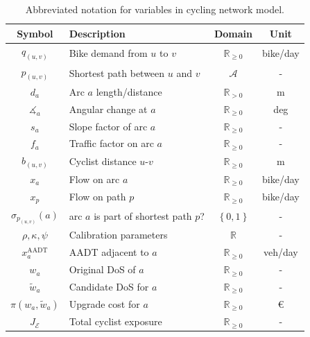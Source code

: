 \documentclass[letterpaper, 10 pt, conference]{ieeeconf}  %
\begin{document}
\begin{table}[h!]
\centering
\vspace{0.2cm}
\begin{tabular}{|c|l|c|c|}
\hline
\textbf{Symbol} & \textbf{Description} & \textbf{Domain} & \textbf{Unit} \\ \hline
$q_{(u,v)}$ & Bike demand from $u$ to $v$ & $\mathbb{R}_{\geq 0}$ & bike/day \\
$p_{(u,v)}$ & Shortest path between $u$ and $v$ & $\mathcal{A}$ & - \\ 
$d_{a}$ & Arc $a$ length/distance & $\mathbb{R}_{>0}$ & m \\ 
$\measuredangle_{a}$ & Angular change at $a$ & $\mathbb{R}_{\geq 0}$ & deg \\ 
$s_{a}$ & Slope factor of arc $a$ & $\mathbb{R}_{\geq 0}$ & - \\ 
$f_{a}$ & Traffic factor on arc $a$ & $\mathbb{R}_{\geq 0}$ & - \\ 
$b_{(u,v)}$ & Cyclist distance $u$-$v$ & $\mathbb{R}_{\geq 0}$ & m \\ 
$x_{a}$ & Flow on arc $a$ & $\mathbb{R}_{\geq 0}$ & bike/day \\ 
$x_{p}$ & Flow on path $p$ & $\mathbb{R}_{\geq 0}$ & bike/day \\ 
$\sigma_{p_{(u,v)}}(a)$ & arc $a$ is part of shortest path $p$? & $ \left\{ 0,1\right\}$ & - \\ 
$\rho, \kappa, \psi$ & Calibration parameters & $\mathbb{R}$ & - \\ 
$x^{\text{AADT}}_{a}$ & AADT adjacent to $a$ & $\mathbb{R}_{\geq 0}$ & veh/day \\ 
$w_{a}$ & Original DoS of $a$ & $\mathbb{R}_{\geq 0}$ & - \\ 
$\tilde{w}_{a}$ & Candidate DoS for $a$ & $\mathbb{R}_{\geq 0}$ & - \\ 
$\pi(w_{a},\tilde{w}_{a})$ & Upgrade cost for $a$ & $\mathbb{R}_{\geq 0}$ & € \\ 
$J_{\mathcal{E}}$ & Total cyclist exposure & $\mathbb{R}_{\geq 0}$ & -\\
\hline
\end{tabular}
\caption{\footnotesize Abbreviated notation for variables in cycling network model.}
\label{table:notation_summary}
\end{table}

\end{document}
